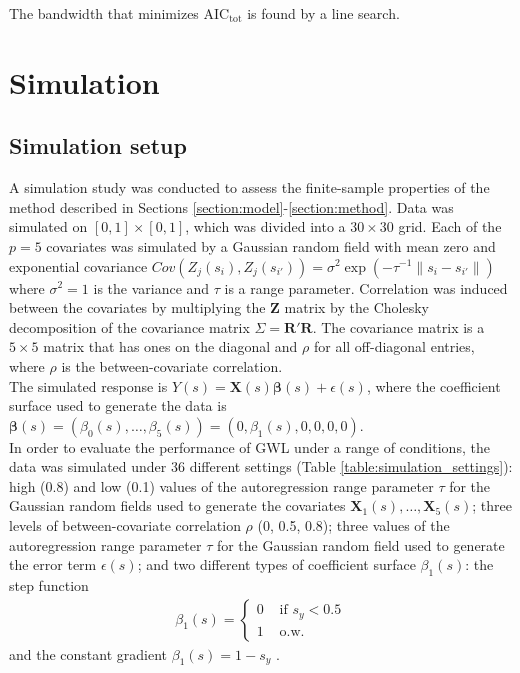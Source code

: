 \documentclass[authoryear, review, 11pt]{elsarticle}
\begin{document}
			The bandwidth that minimizes $\mbox{AIC}_{\mbox{tot}}$ is found by a line search.\\
			
\section{Simulation}
	\subsection{Simulation setup}
		A simulation study was conducted to assess the finite-sample properties of the method described in Sections \ref{section:model}-\ref{section:method}. Data was simulated on $[0,1] \times [0,1]$, which was divided into a $30 \times 30$ grid. Each of the $p=5$ covariates was simulated by a Gaussian random field with mean zero and exponential covariance $Cov \left(Z_j(s_i), Z_j(s_{i'}) \right) = \sigma^2 \exp{\left( -\tau^{-1} \|s_i - s_{i'} \| \right)}$ where $\sigma^2=1$ is the variance and $\tau$ is a range parameter. Correlation was induced between the covariates by multiplying the $\bm{Z}$ matrix by the Cholesky decomposition of the covariance matrix $\Sigma = \bm{R}'\bm{R}$. The covariance matrix is a $5 \times 5$ matrix that has ones on the diagonal and $\rho$ for all off-diagonal entries, where $\rho$ is the between-covariate correlation.\\
		
		The simulated response is $Y(s) = \bm{X}(s) \bm{\beta}(s) + \epsilon(s)$, where the coefficient surface used to generate the data is $\bm{\beta}(s) = \left( \beta_0(s), \dots, \beta_5(s) \right) = \left( 0, \beta_1(s), 0, 0, 0, 0 \right)$.\\
		
		In order to evaluate the performance of GWL under a range of conditions, the data was simulated under 36 different settings (Table \ref{table:simulation_settings}): high (0.8) and low (0.1) values of the autoregression range parameter $\tau$ for the Gaussian random fields used to generate the covariates $\bm{X}_1(s), \dots, \bm{X}_5(s)$; three levels of between-covariate correlation $\rho$ (0, 0.5, 0.8); three values of the autoregression range parameter $\tau$ for the Gaussian random field used to generate the error term $\epsilon(s)$; and two different types of coefficient surface $\beta_1(s)$: the step function
		\begin{eqnarray}
			\beta_1(s) = \begin{cases} 0 &\mbox{ if } s_y<0.5 \\ 1 &\mbox{ o.w.} \end{cases}
		\end{eqnarray}		
		and the constant gradient $\beta_1(s) = 1-s_y$ .
			
\end{document}
